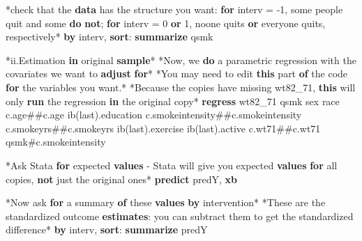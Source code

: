 \documentclass[
  10pt,
]{book}
\newenvironment{Shaded}{\begin{snugshade}}{\end{snugshade}}
\newcommand{\FunctionTok}[1]{\textcolor[rgb]{0.00,0.00,0.00}{#1}}
\newcommand{\KeywordTok}[1]{\textcolor[rgb]{0.13,0.29,0.53}{\textbf{#1}}}
\newcommand{\NormalTok}[1]{#1}
\newcommand{\OtherTok}[1]{\textcolor[rgb]{0.56,0.35,0.01}{#1}}
\begin{document}
\begin{Shaded}
\begin{Highlighting}[]
\NormalTok{*check that the }\KeywordTok{data}\NormalTok{ has the structure you want: }\KeywordTok{for}\NormalTok{ interv = -1, some people quit and some }\KeywordTok{do} \KeywordTok{not}\NormalTok{; }\KeywordTok{for}\NormalTok{ interv = 0 }\KeywordTok{or}\NormalTok{ 1, noone quits }\KeywordTok{or}\NormalTok{ everyone quits, respectively*}
\KeywordTok{by}\NormalTok{ interv, }\KeywordTok{sort}\NormalTok{: }\KeywordTok{summarize}\NormalTok{ qsmk}

\NormalTok{*ii.Estimation }\KeywordTok{in}\NormalTok{ original }\KeywordTok{sample}\NormalTok{*}
\NormalTok{*Now, we }\KeywordTok{do}\NormalTok{ a parametric regression with the covariates we want to }\KeywordTok{adjust} \KeywordTok{for}\NormalTok{*}
\NormalTok{*You may need to edit }\KeywordTok{this}\NormalTok{ part }\KeywordTok{of}\NormalTok{ the code }\KeywordTok{for}\NormalTok{ the variables you want.*}
\NormalTok{*Because the copies have }\FunctionTok{missing}\NormalTok{ wt82_71, }\KeywordTok{this}\NormalTok{ will only }\KeywordTok{run}\NormalTok{ the regression }\KeywordTok{in}\NormalTok{ the original copy*}
\KeywordTok{regress}\NormalTok{ wt82_71 qsmk sex race c.age##c.age ib(}\FunctionTok{last}\NormalTok{).education c.smokeintensity##c.smokeintensity c.smokeyrs##c.smokeyrs ib(}\FunctionTok{last}\NormalTok{).exercise ib(}\FunctionTok{last}\NormalTok{).active c.wt71##c.wt71 qsmk#c.smokeintensity}

\NormalTok{*Ask Stata }\KeywordTok{for}\NormalTok{ expected }\KeywordTok{values}\NormalTok{ - Stata will give you expected }\KeywordTok{values} \KeywordTok{for} \OtherTok{all}\NormalTok{ copies, }\KeywordTok{not}\NormalTok{ just the original ones*}
\KeywordTok{predict}\NormalTok{ predY, }\KeywordTok{xb}

\NormalTok{*Now ask }\KeywordTok{for}\NormalTok{ a summary }\KeywordTok{of}\NormalTok{ these }\KeywordTok{values} \KeywordTok{by}\NormalTok{ intervention*}
\NormalTok{*These are the standardized outcome }\KeywordTok{estimates}\NormalTok{: you can subtract them to }\FunctionTok{get}\NormalTok{ the standardized difference*}
\KeywordTok{by}\NormalTok{ interv, }\KeywordTok{sort}\NormalTok{: }\KeywordTok{summarize}\NormalTok{ predY}


\end{Highlighting}
\end{Shaded}
\end{document}
